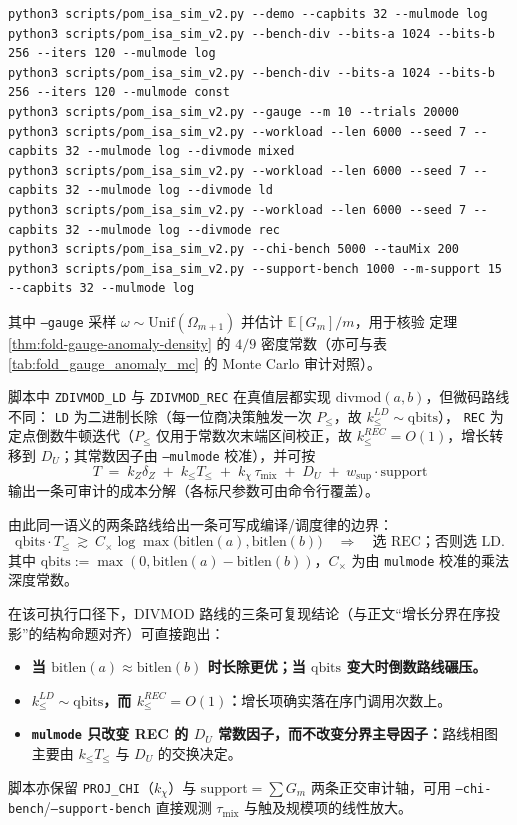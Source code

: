 \begin{remark}
\begin{verbatim}
python3 scripts/pom_isa_sim_v2.py --demo --capbits 32 --mulmode log
python3 scripts/pom_isa_sim_v2.py --bench-div --bits-a 1024 --bits-b 256 --iters 120 --mulmode log
python3 scripts/pom_isa_sim_v2.py --bench-div --bits-a 1024 --bits-b 256 --iters 120 --mulmode const
python3 scripts/pom_isa_sim_v2.py --gauge --m 10 --trials 20000
python3 scripts/pom_isa_sim_v2.py --workload --len 6000 --seed 7 --capbits 32 --mulmode log --divmode mixed
python3 scripts/pom_isa_sim_v2.py --workload --len 6000 --seed 7 --capbits 32 --mulmode log --divmode ld
python3 scripts/pom_isa_sim_v2.py --workload --len 6000 --seed 7 --capbits 32 --mulmode log --divmode rec
python3 scripts/pom_isa_sim_v2.py --chi-bench 5000 --tauMix 200
python3 scripts/pom_isa_sim_v2.py --support-bench 1000 --m-support 15 --capbits 32 --mulmode log
\end{verbatim}
其中 \texttt{--gauge} 采样 \(\omega\sim\mathrm{Unif}(\Omega_{m+1})\) 并估计 \(\mathbb{E}[G_m]/m\)，用于核验
定理 \ref{thm:fold-gauge-anomaly-density} 的 \(4/9\) 密度常数（亦可与表 \ref{tab:fold_gauge_anomaly_mc} 的 Monte Carlo 审计对照）。
\par
脚本中 \texttt{ZDIVMOD\_LD} 与 \texttt{ZDIVMOD\_REC} 在真值层都实现 \(\mathrm{divmod}(a,b)\)，但微码路线不同：
\texttt{LD} 为二进制长除（每一位商决策触发一次 \(P_{\le}\)，故 \(k_{\le}^{LD}\sim \mathrm{qbits}\)），
\texttt{REC} 为定点倒数牛顿迭代（\(P_{\le}\) 仅用于常数次末端区间校正，故 \(k_{\le}^{REC}=O(1)\)，增长转移到 \(D_U\)；其常数因子由 \texttt{--mulmode} 校准），并可按
\[
T\;=\;k_Z\delta_Z\;+\;k_{\le}T_{\le}\;+\;k_\chi\,\tau_{\mathrm{mix}}\;+\;D_U\;+\;w_{\mathrm{sup}}\cdot \mathrm{support}
\]
输出一条可审计的成本分解（各标尺参数可由命令行覆盖）。
\par
由此同一语义的两条路线给出一条可写成编译/调度律的边界：
\[
\mathrm{qbits}\cdot T_{\le}\ \gtrsim\ C_{\times}\log \max\bigl(\mathrm{bitlen}(a),\mathrm{bitlen}(b)\bigr)\quad\Longrightarrow\quad \text{选 REC；否则选 LD.}
\]
其中 \(\mathrm{qbits}:=\max(0,\mathrm{bitlen}(a)-\mathrm{bitlen}(b))\)，\(C_{\times}\) 为由 \texttt{mulmode} 校准的乘法深度常数。
\par
在该可执行口径下，DIVMOD 路线的三条可复现结论（与正文“增长分界在序投影”的结构命题对齐）可直接跑出：
\begin{itemize}
  \item \textbf{当 \(\mathrm{bitlen}(a)\approx \mathrm{bitlen}(b)\) 时长除更优；当 \(\mathrm{qbits}\) 变大时倒数路线碾压。}
  \item \textbf{\(k_{\le}^{LD}\sim \mathrm{qbits}\)，而 \(k_{\le}^{REC}=O(1)\)：}增长项确实落在序门调用次数上。
  \item \textbf{\texttt{mulmode} 只改变 REC 的 \(D_U\) 常数因子，而不改变分界主导因子：}路线相图主要由 \(k_{\le}T_{\le}\) 与 \(D_U\) 的交换决定。
\end{itemize}
脚本亦保留 \texttt{PROJ\_CHI}（\(k_\chi\)）与 \(\mathrm{support}=\sum G_m\) 两条正交审计轴，可用 \texttt{--chi-bench}/\texttt{--support-bench} 直接观测 \(\tau_{\mathrm{mix}}\) 与触及规模项的线性放大。
\end{remark}

